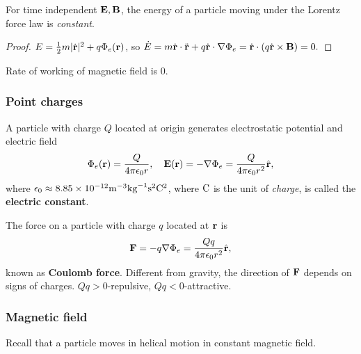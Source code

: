 \begin{proposition}
    For time independent $ {\bf E},{\bf B} $, the energy of a particle moving under the Lorentz force law is \textit{constant}.
\end{proposition}
\begin{proof}
    $ E = \frac{1}{2}m|\dot{{\bf r}}|^2+q\Phi_e({\bf r}) $, so $ \dot{E}=m \dot{{\bf r}} \cdot \ddot{{\bf r}}+q \dot{{\bf r}}\cdot \nabla \Phi_e = \dot{{\bf r}}\cdot (q \dot{{\bf r}}\times {\bf B}) =0. $
\end{proof}
\begin{note}
    Rate of working of magnetic field is 0.
\end{note}

\subsubsection{Point charges}
A particle with charge $Q$ located at origin generates electrostatic potential and electric field
\[
    \Phi_e({\bf r}) = \frac{Q}{4\pi \epsilon_0 r},\quad {\bf E}({\bf r}) = -\nabla \Phi_e = \frac{Q}{4\pi \epsilon_0 r^2} \hat{{\bf r}},
\]
where $ \epsilon_0 \approx 8.85 \times 10^{-12}\mathrm{m}^{-3}\mathrm{kg}^{-1}\mathrm{s}^2\mathrm{C}^2 $, where $ \mathrm{C} $ is the unit of \textit{charge}, is called the \textbf{electric constant}.

The force on a particle with charge $q$ located at ${\bf r}$ is 
\[
    \mathbf{F} = -q \nabla \Phi_e = \frac{Qq}{4\pi \epsilon_0 r^2}\hat{{\bf r}},
\]
known as \textbf{Coulomb force}. Different from gravity, the direction of ${\bf F}$ depends on signs of charges. $ Qq>0 $-repulsive, $ Qq<0 $-attractive.

\subsubsection{Magnetic field}
Recall that a particle moves in helical motion in constant magnetic field.